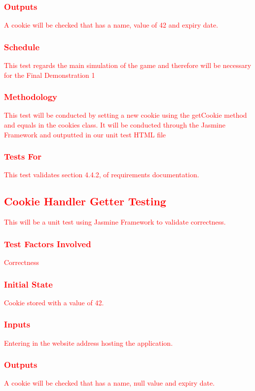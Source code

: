 \documentclass[11pt, oneside]{article}   	%
\begin{document}
\subsubsection{\textcolor{red}{Outputs}}
\textcolor{red}{A cookie will be checked that has a name, value of 42 and expiry date.}
\subsubsection{\textcolor{red}{Schedule}}
\textcolor{red}{This test regards the main simulation of the game and therefore will be necessary for the Final Demonstration 1}
\subsubsection{\textcolor{red}{Methodology}}
\textcolor{red}{This test will be conducted by setting a new cookie using the getCookie method and equals in the cookies class. It will be conducted through the Jasmine Framework and outputted in our unit test HTML file}
\subsubsection{\textcolor{red}{Tests For}}
\textcolor{red}{This test validates section 4.4.2, of requirements documentation.}


\subsection{\textcolor{red}{Cookie Handler Getter Testing}}
\textcolor{red}{This will be a unit test using Jasmine Framework to validate correctness.}
\subsubsection{\textcolor{red}{Test Factors Involved}}
\textcolor{red}{Correctness}
\subsubsection{\textcolor{red}{Initial State}}
\textcolor{red}{Cookie stored with a value of 42.}
\subsubsection{\textcolor{red}{Inputs}}
\textcolor{red}{Entering in the website address hosting the application. }
\subsubsection{\textcolor{red}{Outputs}}
\textcolor{red}{A cookie will be checked that has a name, null value and expiry date.}
\end{document}
